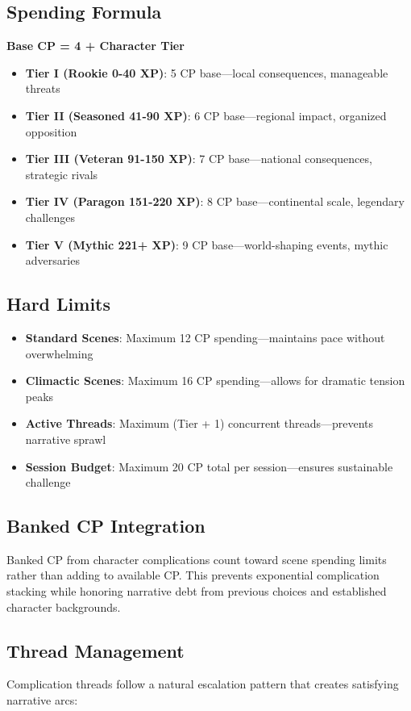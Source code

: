 \subsection*{Spending Formula}
\textbf{Base CP = 4 + Character Tier}
\begin{itemize}
    \item \textbf{Tier I (Rookie 0-40 XP)}: 5 CP base—local consequences, manageable threats
    \item \textbf{Tier II (Seasoned 41-90 XP)}: 6 CP base—regional impact, organized opposition
    \item \textbf{Tier III (Veteran 91-150 XP)}: 7 CP base—national consequences, strategic rivals
    \item \textbf{Tier IV (Paragon 151-220 XP)}: 8 CP base—continental scale, legendary challenges
    \item \textbf{Tier V (Mythic 221+ XP)}: 9 CP base—world-shaping events, mythic adversaries
\end{itemize}

\subsection*{Hard Limits}
\begin{itemize}
    \item \textbf{Standard Scenes}: Maximum 12 CP spending—maintains pace without overwhelming
    \item \textbf{Climactic Scenes}: Maximum 16 CP spending—allows for dramatic tension peaks
    \item \textbf{Active Threads}: Maximum (Tier + 1) concurrent threads—prevents narrative sprawl
    \item \textbf{Session Budget}: Maximum 20 CP total per session—ensures sustainable challenge
\end{itemize}

\subsection*{Banked CP Integration}
Banked CP from character complications count toward scene spending limits rather than adding to available CP. This prevents exponential complication stacking while honoring narrative debt from previous choices and established character backgrounds.

\subsection*{Thread Management}
Complication threads follow a natural escalation pattern that creates satisfying narrative arcs:

